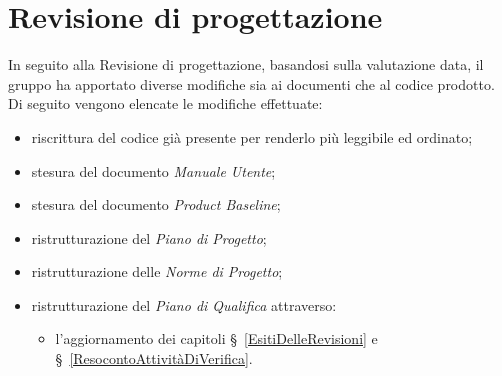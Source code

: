 \section{Revisione di progettazione}\label{EsitiDelleRevisioniRevisioneDiProgettazione}

In seguito alla Revisione di progettazione, basandosi sulla valutazione data, il gruppo ha apportato diverse modifiche sia ai documenti che al codice prodotto. Di seguito vengono elencate le modifiche effettuate:
\begin{itemize}
	\item riscrittura del codice già presente per renderlo più leggibile ed ordinato;
	\item stesura del documento \textit{Manuale Utente};
	\item stesura del documento \textit{Product Baseline};
	\item ristrutturazione del \textit{Piano di Progetto};
	\item ristrutturazione delle \textit{Norme di Progetto};
	\item ristrutturazione del \textit{Piano di Qualifica} attraverso:
	\begin{itemize}
		\item l'aggiornamento dei capitoli \S~\ref{EsitiDelleRevisioni} e \S~\ref{ResocontoAttivitàDiVerifica}.
	\end{itemize}
\end{itemize}
